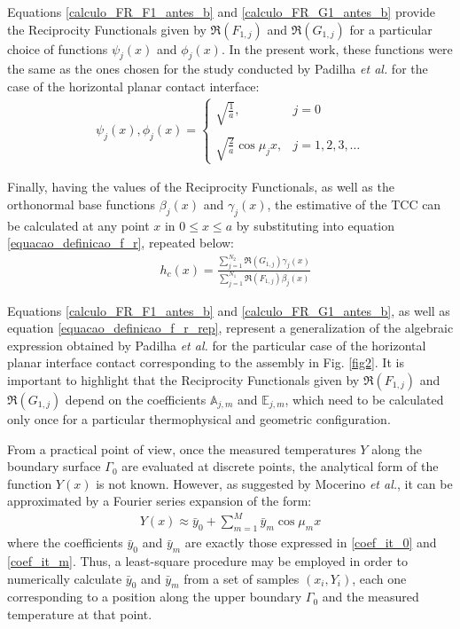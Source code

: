 \documentclass[conference,compsoc,fleqn]{IEEEtran}
\begin{document}
Equations \eqref{calculo_FR_F1_antes_b} and \eqref{calculo_FR_G1_antes_b} provide the Reciprocity Functionals given by $\Re(F_{1,j})$ and $\Re(G_{1,j})$ for a particular choice of functions $\psi_j(x)$ and $\phi_j(x)$. In the present work, these functions were the same as the ones chosen for the study conducted by Padilha \textit{et al.}\cite{artigo_padilha_3} for the case of the horizontal planar contact interface:
\begin{align}
\psi_j(x), \phi_j(x) = \left\lbrace
\begin{array}{ll}
\sqrt{\frac{1}{a}}, & j = 0 \\ \nonumber \\
\sqrt{\frac{2}{a}}\cos \mu_j x, & j = 1,2,3,\ldots
\end{array}
\right.
\end{align} 

Finally, having the values of the Reciprocity Functionals, as well as the orthonormal base functions $\beta_j(x)$ and $\gamma_j(x)$, the estimative of the TCC can be calculated at any point $x$ in $0 \le x \le a$ by substituting into equation \eqref{equacao_definicao_f_r}, repeated below:
\begin{align}
& h_c(x) %
= \frac{\displaystyle\sum_{j=1}^{N_2} \Re(G_{1,j}) \gamma_j(x)}{\displaystyle\sum_{j=1}^{N_1} \Re(F_{1,j}) \beta_j(x)}
\label{equacao_definicao_f_r_rep}
\end{align}

Equations \eqref{calculo_FR_F1_antes_b} and \eqref{calculo_FR_G1_antes_b}, as well as equation \eqref{equacao_definicao_f_r_rep}, represent a generalization of the algebraic expression obtained by Padilha \textit{et al.}\cite{artigo_padilha_3} for the particular case of the horizontal planar interface contact corresponding to the assembly in Fig. \ref{fig2}. It is important to highlight that the Reciprocity Functionals given by $\Re(F_{1,j})$ and $\Re(G_{1,j})$ depend on the coefficients $\mathbb{A}_{j,m}$ and $\mathbb{E}_{j,m}$, which need to be calculated only once for a particular thermophysical and geometric configuration.

From a practical point of view, once the measured temperatures $Y$ along the boundary surface $\Gamma_0$ are evaluated at discrete points, the analytical form of the function $Y(x)$ is not known. However, as suggested by Mocerino \textit{et al.}\cite{artigo_mocerino}, it can be approximated by a Fourier series expansion of the form:
\begin{align}
Y(x) \approx \bar{y}_0 + \sum_{m=1}^M \bar{y}_m \cos\mu_m x \label{aproximacao_Y}
\end{align}
where the coefficients $\bar{y}_0$ and $\bar{y}_m$ are exactly those expressed in \eqref{coef_it_0} and \eqref{coef_it_m}. Thus, a least-square procedure may be employed in order to numerically calculate $\bar{y}_0$ and $\bar{y}_m$ from a set of samples $(x_i, Y_i)$, each one corresponding to a position along the upper boundary $\Gamma_0$ and the measured temperature at that point.
\\
\end{document}
